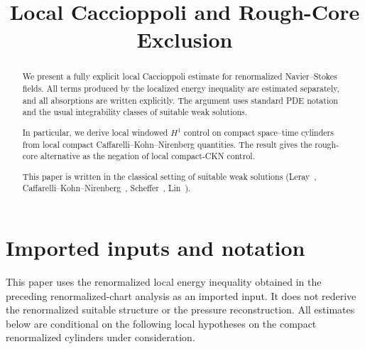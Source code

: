 \documentclass[11pt]{amsart}
\title[Local Caccioppoli and Rough-Core Exclusion]{Local Caccioppoli and Rough-Core Exclusion}
\author{}
\date{}
\theoremstyle{plain}
\theoremstyle{definition}
\theoremstyle{remark}
\begin{document}
\begin{abstract}
We present a fully explicit local Caccioppoli estimate for renormalized Navier--Stokes fields. All terms produced by the localized energy inequality are estimated separately, and all absorptions are written explicitly. The argument uses standard PDE notation and the usual integrability classes of suitable weak solutions.

In particular, we derive local windowed $H^1$ control on compact space--time cylinders from local compact Caffarelli--Kohn--Nirenberg quantities. The result gives the rough-core alternative as the negation of local compact-CKN control.

This paper is written in the classical setting of suitable weak solutions (Leray~\cite{Leray1934}, Caffarelli--Kohn--Nirenberg~\cite{CaffarelliKohnNirenberg1982}, Scheffer~\cite{Scheffer1976}, Lin~\cite{Lin1998}).
\end{abstract}

\maketitle

\section{Imported inputs and notation}

This paper uses the renormalized local energy inequality obtained in the preceding
renormalized-chart analysis as an imported input. It does not rederive the
renormalized suitable structure or the pressure reconstruction. All estimates
below are conditional on the following local hypotheses on the compact
renormalized cylinders under consideration.
\end{document}
